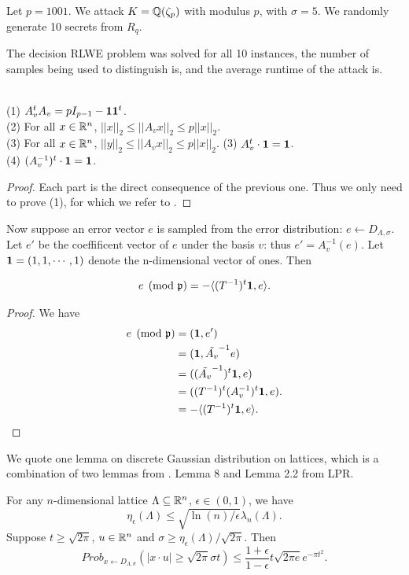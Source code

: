 \documentclass{amsart}
\begin{document}
\begin{Example}
Let $p = 1001$. We attack $K = \mathbb{Q}(\zeta_p)$ with modulus $p$, with $\sigma = 5$. We randomly generate 10 secrets from $R_q$.

The decision RLWE problem was solved for all 10 instances, the number of samples being used to distinguish is, and the average runtime of the attack is.
\end{Example}

\begin{Lemma} \qquad \\
(1) $A_v^t A_v = pI_{p-1} - {\bf 1} {\bf 1}^t$.\\
(2) For all $x \in \mathbb{R}^n$, $||x||_2 \leq ||A_v x||_2 \leq p||x||_2$. \\
(3) For all $x \in \mathbb{R}^n$, $||y||_2 \leq ||A_v x||_2 \leq p||x||_2$.
(3) $A_v^t \cdot {\bf 1} = {\bf 1}$. \\
(4) $(A_v^{-1})^t \cdot {\bf 1} = {\bf 1}$.
\end{Lemma}

\begin{proof}
Each part is the direct consequence of the previous one. Thus we only need to prove (1), for which we refer to \cite{ducas2012ring}.
\end{proof}

Now suppose an error vector $e$ is sampled from the error distribution: $e \gets D_{\Lambda, \sigma}$.  Let $e'$ be the coeffificent vector of $e$ under the basis $v$: thus $e' = A_v^{-1}(e)$. Let ${\bf 1} = (1,1, \cdots,1)$ denote the n-dimensional vector of ones. Then

\begin{Lemma}
\[
e\pmod{\mathfrak{p}} = -\langle (T^{-1})^{t} {\bf 1}, e \rangle.
\]
\end{Lemma}
\begin{proof}
We have
\begin{align*}
e\pmod{\mathfrak{p}}  &= ({\bf 1}, e') \\
&=  ({\bf 1},  \tilde{A_v}^{-1} e) \\
& = ((\tilde{A_v}^{-1})^t {\bf 1}, e) \\
& = ((T^{-1})^{t} (A_v^{-1})^t{\bf 1}, e). \\
& = -\langle (T^{-1})^{t} {\bf 1}, e \rangle.
\end{align*}
\end{proof}

We quote one lemma on discrete Gaussian distribution on lattices, which is a combination of two lemmas from \cite{langlois2014worst}. Lemma 8 and Lemma 2.2  from LPR.
\begin{Lemma}
\label{lem: last}
For any $n$-dimensional lattice $\Lambda \subseteq \mathbb{R}^n$, $\epsilon \in (0,1)$, we have
$$\eta_\epsilon(\Lambda) \leq \sqrt{\ln(n)/\epsilon} \lambda_n(\Lambda).$$
Suppose $t \geq \sqrt{2 \pi}$, $u \in \mathbb{R}^n$ and $\sigma \geq \eta_\epsilon(\Lambda)/\sqrt{2 \pi}$. Then
\[
    Prob_{x \gets D_{\Lambda,\sigma}}(|x \cdot u| \geq \sqrt{2 \pi}\sigma t) \leq \frac{1+\epsilon}{1-\epsilon} t \sqrt{2 \pi e} e^{- \pi t^2}.
\]
\end{Lemma}
\end{document}
